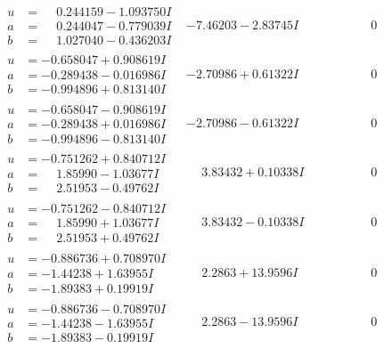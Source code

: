 \documentclass[1p]{elsarticle_modified}
\theoremstyle{definition}
\begin{document}
$$\begin{array}{c|c|c}
\begin{aligned}
u &= \phantom{-}0.244159 - 1.093750 I \\
a &= \phantom{-}0.244047 - 0.779039 I \\
b &= \phantom{-}1.027040 - 0.436203 I\end{aligned}
 & -7.46203 - 2.83745 I & \phantom{-0.000000 } 0 \\ \hline\begin{aligned}
u &= -0.658047 + 0.908619 I \\
a &= -0.289438 - 0.016986 I \\
b &= -0.994896 + 0.813140 I\end{aligned}
 & -2.70986 + 0.61322 I & \phantom{-0.000000 } 0 \\ \hline\begin{aligned}
u &= -0.658047 - 0.908619 I \\
a &= -0.289438 + 0.016986 I \\
b &= -0.994896 - 0.813140 I\end{aligned}
 & -2.70986 - 0.61322 I & \phantom{-0.000000 } 0 \\ \hline\begin{aligned}
u &= -0.751262 + 0.840712 I \\
a &= \phantom{-}1.85990 - 1.03677 I \\
b &= \phantom{-}2.51953 - 0.49762 I\end{aligned}
 & \phantom{-}3.83432 + 0.10338 I & \phantom{-0.000000 } 0 \\ \hline\begin{aligned}
u &= -0.751262 - 0.840712 I \\
a &= \phantom{-}1.85990 + 1.03677 I \\
b &= \phantom{-}2.51953 + 0.49762 I\end{aligned}
 & \phantom{-}3.83432 - 0.10338 I & \phantom{-0.000000 } 0 \\ \hline\begin{aligned}
u &= -0.886736 + 0.708970 I \\
a &= -1.44238 + 1.63955 I \\
b &= -1.89383 + 0.19919 I\end{aligned}
 & \phantom{-}2.2863 + 13.9596 I & \phantom{-0.000000 } 0 \\ \hline\begin{aligned}
u &= -0.886736 - 0.708970 I \\
a &= -1.44238 - 1.63955 I \\
b &= -1.89383 - 0.19919 I\end{aligned}
 & \phantom{-}2.2863 - 13.9596 I & \phantom{-0.000000 } 0 \\ \hline\begin{aligned}

\end{aligned}
\end{array}$$
\end{document}
